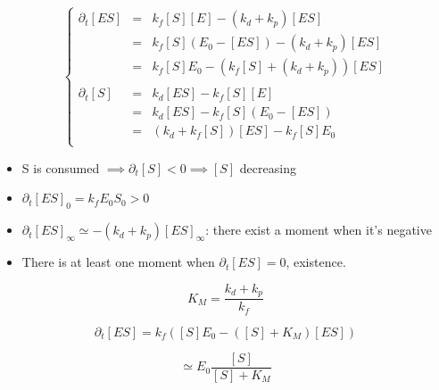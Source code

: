\documentclass[aps,12pt]{revtex4}
\begin{document}
\begin{equation}
\left\lbrace
\begin{array}{rcl}
\partial_t [ES] & = & k_f [S] [E] - (k_d+k_p) [ES]\\
                & = & k_f [S] (E_0-[ES]) - (k_d+k_p) [ES]\\
                & = & k_f [S] E_0 - (k_f [S] + (k_d+k_p)) [ES]\\
                \\
\partial_t [S] & = & k_d[ES] - k_f [S][E] \\
               & = & k_d[ES] - k_f [S](E_0 - [ES])\\
               & = & (k_d+k_f[S])[ES] - k_f[S]E_0 \\
\end{array}
\right.
\end{equation}

\begin{itemize}
	\item S is consumed $\implies \partial_t [S] < 0 \implies [S]$ decreasing
	\item $\partial_t [ES]_0 = k_f E_0 S_0 > 0$
	\item $\partial_t [ES]_\infty \simeq - (k_d+k_p) [ES]_\infty$: there exist a moment when it's negative
	\item There is at least one moment when $\partial_t [ES]=0$, existence.
\end{itemize}

\begin{equation}
	K_M = \dfrac{k_d+k_p}{k_f}
\end{equation}

\begin{equation}
	\partial_t [ES] = k_f( [S]E_0 - ([S]+K_M) [ES] )
\end{equation}

\begin{equation}
	[ES] \simeq E_0 \dfrac{[S]}{[S]+K_M}
\end{equation}
\end{document}
